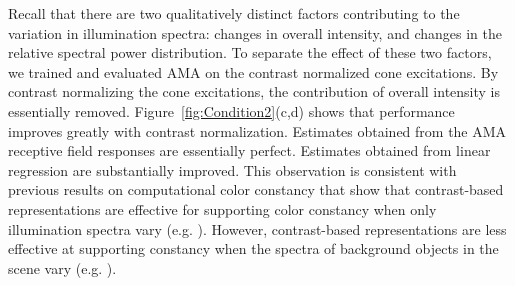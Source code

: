 \documentclass{jov}
\begin{document}
Recall that there are two qualitatively distinct factors contributing to the variation in illumination spectra: changes in overall intensity, and changes in the relative spectral power distribution. 
To separate the effect of these two factors, we trained and evaluated AMA on the contrast normalized cone excitations. 
By contrast normalizing the cone excitations, the contribution of overall intensity is essentially removed.
Figure~\ref{fig:Condition2}(c,d) shows that performance improves greatly with contrast normalization. 
Estimates obtained from the AMA receptive field responses are essentially perfect. 
Estimates obtained from linear regression are substantially improved.
This observation is consistent with previous results on computational color constancy that show that 
contrast-based representations are effective for supporting color constancy when only illumination spectra vary (e.g. ).
However, contrast-based representations are less effective at supporting constancy when the spectra of background objects in the scene vary (e.g. ).
\end{document}
